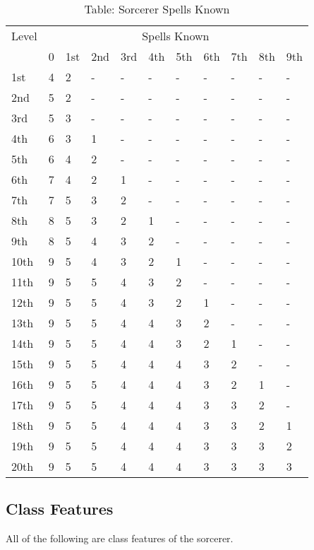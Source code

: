 \begin{table}[]
\caption{Table: Sorcerer Spells Known}
\sffamily
\setlength{\tabcolsep}{1pt}
\begin{tabular}{lllllllllll}
Level & \multicolumn{10}{c}{Spells Known}\\
      & 0 & 1st & 2nd & 3rd & 4th & 5th & 6th & 7th & 8th & 9th\\
1st & 4 & 2 & - & - & - & - & - & - & - & -\\
2nd & 5 & 2 & - & - & - & - & - & - & - & -\\
3rd & 5 & 3 & - & - & - & - & - & - & - & -\\
4th & 6 & 3 & 1 & - & - & - & - & - & - & -\\
5th & 6 & 4 & 2 & - & - & - & - & - & - & -\\
6th & 7 & 4 & 2 & 1 & - & - & - & - & - & -\\
7th & 7 & 5 & 3 & 2 & - & - & - & - & - & -\\
8th & 8 & 5 & 3 & 2 & 1 & - & - & - & - & -\\
9th & 8 & 5 & 4 & 3 & 2 & - & - & - & - & -\\
10th & 9 & 5 & 4 & 3 & 2 & 1 & - & - & - & -\\
11th & 9 & 5 & 5 & 4 & 3 & 2 & - & - & - & -\\
12th & 9 & 5 & 5 & 4 & 3 & 2 & 1 & - & - & -\\
13th & 9 & 5 & 5 & 4 & 4 & 3 & 2 & - & - & -\\
14th & 9 & 5 & 5 & 4 & 4 & 3 & 2 & 1 & - & -\\
15th & 9 & 5 & 5 & 4 & 4 & 4 & 3 & 2 & - & -\\
16th & 9 & 5 & 5 & 4 & 4 & 4 & 3 & 2 & 1 & -\\
17th & 9 & 5 & 5 & 4 & 4 & 4 & 3 & 3 & 2 & -\\
18th & 9 & 5 & 5 & 4 & 4 & 4 & 3 & 3 & 2 & 1\\
19th & 9 & 5 & 5 & 4 & 4 & 4 & 3 & 3 & 3 & 2\\
20th & 9 & 5 & 5 & 4 & 4 & 4 & 3 & 3 & 3 & 3\\
\end{tabular}
\end{table}

\subsection{Class Features}

				
All of the following are class features of the sorcerer.
				
